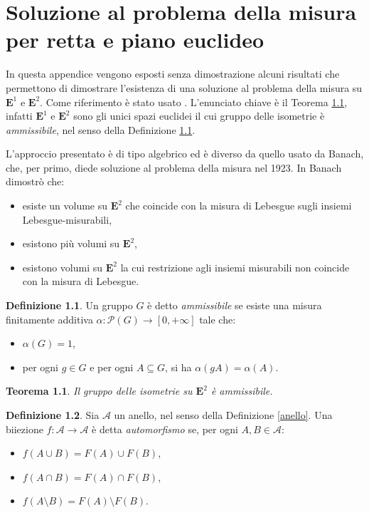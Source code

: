 \documentclass[a4paper,oneside,11pt]{book}
\theoremstyle{definition} \newtheorem{Def}{Definizione}
\theoremstyle{plain} \newtheorem{teo}{Teorema}
\theoremstyle{plain} \newtheorem{cor}[teo]{Corollario}
\theoremstyle{definition} \newtheorem{lem}[teo]{Lemma}
\theoremstyle{plain} \newtheorem{pro}[teo]{Proposizione}
\begin{document}
\appendix
\chapter{Soluzione al problema della misura per retta e piano euclideo}
	
	In questa appendice vengono esposti senza dimostrazione alcuni risultati che permettono di dimostrare l'esistenza di una soluzione al problema della misura su $\mathbf{E}^1$ e $\mathbf{E}^2$. Come riferimento è stato usato \cite{wagon}. L'enunciato chiave è il Teorema \ref{isoamm}, infatti $\mathbf{E}^1$ e $\mathbf{E}^2$ sono gli unici spazi euclidei il cui gruppo delle isometrie è \emph{ammissibile}, nel senso della Definizione \ref{ammissibile}.
	
	L'approccio presentato è di tipo algebrico ed è diverso da quello usato da Banach, che, per primo, diede soluzione al problema della misura nel 1923. In \cite{mesure} Banach dimostrò che:
	\begin{itemize}
		\item esiste un volume su $\mathbf{E}^2$ che coincide con la misura di Lebesgue sugli insiemi Lebesgue-misurabili,
		\item esistono più volumi su $\mathbf{E}^2$,
		\item esistono volumi su $\mathbf{E}^2$ la cui restrizione agli insiemi misurabili non coincide con la misura di Lebesgue.
	\end{itemize}
	
	\bigskip	
	
	\begin{Def}\label{ammissibile}
		Un gruppo $G$ è detto \emph{ammissibile} se esiste una misura finitamente additiva $\alpha: \mathcal{P}(G) \to [0, +\infty]$ tale che:
		\begin{itemize}
			\item $\alpha(G) = 1$,
			\item per ogni $g \in G$ e per ogni $A \subseteq G$, si ha $\alpha(gA) = \alpha(A)$.
		\end{itemize}
	\end{Def}
	
	\begin{teo}\label{isoamm}
		Il gruppo delle isometrie su $\mathbf{E}^2$ è ammissibile.
	\end{teo}
	
	\begin{Def}
		Sia $\mathcal{A}$ un anello, nel senso della Definizione \ref{anello}. Una biiezione $f : \mathcal{A} \to \mathcal{A}$ è detta \emph{automorfismo} se, per ogni $A, B \in \mathcal{A}$:
		\begin{itemize}
			\item $f(A \cup B) = F(A) \cup F(B)$,
			\item $f(A \cap B) = F(A) \cap F(B)$,
			\item $f(A \setminus B) = F(A) \setminus F(B)$.
		\end{itemize}
	\end{Def}
	
\end{document}

